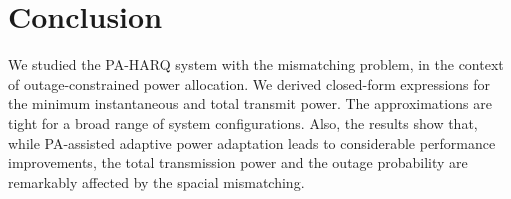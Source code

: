 \section{Conclusion}
We studied the PA-HARQ system with the mismatching problem, in the context of outage-constrained power allocation. We derived  closed-form expressions for the minimum instantaneous and  total transmit power. The approximations are tight for a broad range of system configurations. Also, the  results show that, while PA-assisted adaptive power adaptation leads to considerable performance improvements, the total transmission power and the outage probability are remarkably affected by the spacial mismatching.









